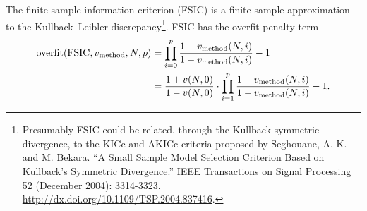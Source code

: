 \documentclass[12pt,letterpaper]{article}
\begin{document}
The finite sample information criterion (FSIC) is a finite sample approximation
to the Kullback--Leibler discrepancy\footnote{Presumably FSIC could be related,
through the Kullback symmetric divergence, to the KICc and AKICc criteria
proposed by Seghouane, A. K. and M. Bekara.  ``A Small Sample Model Selection
Criterion Based on Kullback's Symmetric Divergence.'' IEEE Transactions on
Signal Processing 52 (December 2004): 3314-3323.
\url{http://dx.doi.org/10.1109/TSP.2004.837416}.}. FSIC has the overfit penalty
term
\begin{align}
    \text{overfit}\!\left(\text{FSIC},v_\text{method},N,p\right)
    &=
    \prod_{i=0}^{p}
    \frac{
        1 + v_\text{method}\!\left(N,i\right)
    }{
        1 - v_\text{method}\!\left(N,i\right)
    }
    - 1
    \notag
    \\
    &=
    \frac{
        1 + v\!\left(N,0\right)
    }{
        1 - v\!\left(N,0\right)
    }
    \cdot
    \prod_{i=1}^{p}
    \frac{
        1 + v_\text{method}\!\left(N,i\right)
    }{
        1 - v_\text{method}\!\left(N,i\right)
    }
    - 1
    .
    \label{eq:fsicGeneral}
\end{align}
\end{document}
